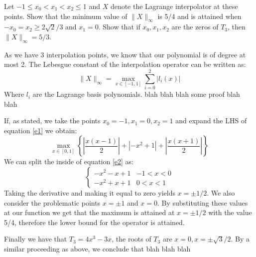 \begin{problem}
Let $-1 \leq x_0 < x_1 < x_2 \leq 1$ and $X$ denote the Lagrange
interpolator at these points. Show that the minimum value of
$\lVert X \rVert_\infty$ is 5/4 and is attained when $-x_0 = x_2 \geq 2
\sqrt{2}/3$ and $x_1 = 0$. Show that if $x_0 , x_1 , x_2$ are
the zeros of $T_3$, then $\lVert X \rVert_\infty = 5/3$.
\end{problem}


\begin{solution}  
As we have 3 interpolation points, we know that our polynomial is of degree at most 2. The Lebesgue constant of the interpolation operator can be written as:
\begin{equation}
\lVert X \rVert_{\infty} = \max_{x\in [-1,1]} \sum_{i=0}^2 \lvert l_i(x) \rvert
\label{e1}
\end{equation}
Where $l_i$ are the Lagrange basis polynomials. blah blah blah some proof blah blah

If, as stated, we take the points $x_0 = -1, x_1 = 0, x_2 = 1$ and expand the LHS of equation \ref{e1} we obtain:
\begin{equation}
\max_{x \in [0,1]} \left \{ \left | \frac{x(x-1)}{2} \right | + \left | -x^2+1 \right | + \left | \frac{x(x+1)}{2} \right | \right \}
\label{e2}
\end{equation}
We can split the inside of equation \ref{e2} as:
\[ \begin{cases} 
      -x^2-x+1  &-1< x< 0 \\
      -x^2+x+1  &0< x<1 
   \end{cases}
\]
Taking the derivative and making it equal to zero yields $x = \pm 1/2$. We also consider the problematic points $x = \pm 1$ and $x = 0$. By substituting these values at our function we get that the maximum is attained at $x=\pm 1/2$ with the value 5/4, therefore the lower bound for the operator is attained.

Finally we have that $T_3 = 4x^3-3x$, the roots of $T_3$ are $x=0, x=\pm \sqrt{3}/2$. By a similar proceeding as above, we conclude that blah blah blah
\end{solution}

